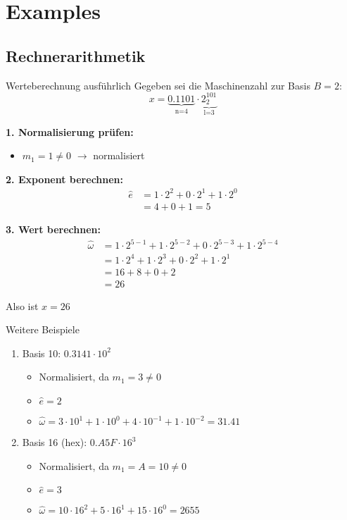 \section{Examples}

\subsection{Rechnerarithmetik}

\begin{example2}{Werteberechnung ausführlich} 
Gegeben sei die Maschinenzahl zur Basis $B=2$:
$$x = \underbrace{0.1101}_{\text{n=4}} \cdot \underbrace{2^{101}_2}_{\text{l=3}}$$

\textbf{1. Normalisierung prüfen:}
\begin{itemize}
    \item $m_1 = 1 \neq 0$ $\rightarrow$ normalisiert
\end{itemize}

\textbf{2. Exponent berechnen:}
\begin{align*}
\hat{e} &= 1 \cdot 2^2 + 0 \cdot 2^1 + 1 \cdot 2^0 \\
&= 4 + 0 + 1 = 5
\end{align*}

\textbf{3. Wert berechnen:}
\begin{align*}
\hat{\omega} &= 1 \cdot 2^{5-1} + 1 \cdot 2^{5-2} + 0 \cdot 2^{5-3} + 1 \cdot 2^{5-4} \\
&= 1 \cdot 2^4 + 1 \cdot 2^3 + 0 \cdot 2^2 + 1 \cdot 2^1 \\
&= 16 + 8 + 0 + 2 \\
&= 26
\end{align*}

Also ist $x = 26$
\end{example2}

\begin{example2}{Weitere Beispiele}
\begin{enumerate}
    \item Basis 10: $0.3141 \cdot 10^2$
    \begin{itemize}
        \item Normalisiert, da $m_1 = 3 \neq 0$
        \item $\hat{e} = 2$
        \item $\hat{\omega} = 3 \cdot 10^1 + 1 \cdot 10^0 + 4 \cdot 10^{-1} + 1 \cdot 10^{-2} = 31.41$
    \end{itemize}
    
    \item Basis 16 (hex): $0.A5F \cdot 16^3$
    \begin{itemize}
        \item Normalisiert, da $m_1 = A = 10 \neq 0$
        \item $\hat{e} = 3$
        \item $\hat{\omega} = 10 \cdot 16^2 + 5 \cdot 16^1 + 15 \cdot 16^0 = 2655$
    \end{itemize}
\end{enumerate}
\end{example2}

